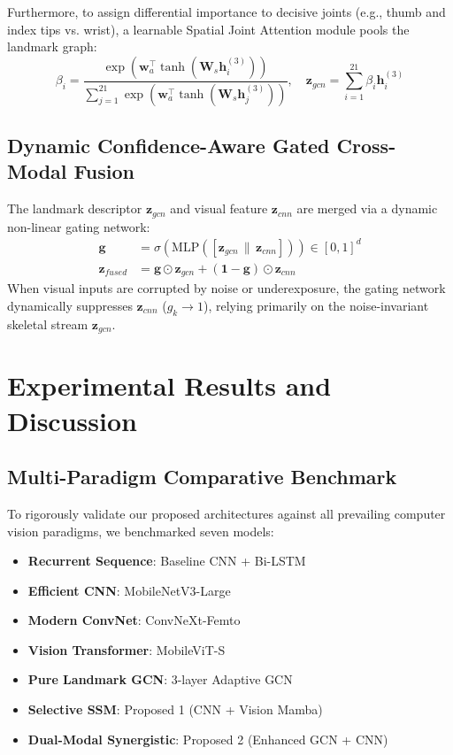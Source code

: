 \documentclass[journal]{IEEEtran}
\begin{document}
Furthermore, to assign differential importance to decisive joints (e.g., thumb and index tips vs. wrist), a learnable Spatial Joint Attention module pools the landmark graph:
\begin{equation}
    \beta_i = \frac{\exp\left(\mathbf{w}_a^\top \tanh(\mathbf{W}_s \mathbf{h}_i^{(3)})\right)}{\sum_{j=1}^{21} \exp\left(\mathbf{w}_a^\top \tanh(\mathbf{W}_s \mathbf{h}_j^{(3)})\right)}, \quad \mathbf{z}_{gcn} = \sum_{i=1}^{21} \beta_i \mathbf{h}_i^{(3)}
\end{equation}

\subsection{Dynamic Confidence-Aware Gated Cross-Modal Fusion}
The landmark descriptor $\mathbf{z}_{gcn}$ and visual feature $\mathbf{z}_{cnn}$ are merged via a dynamic non-linear gating network:
\begin{align}
    \mathbf{g} &= \sigma\left( \text{MLP}\left([\mathbf{z}_{gcn} \,\|\, \mathbf{z}_{cnn}]\right) \right) \in [0, 1]^d \\
    \mathbf{z}_{fused} &= \mathbf{g} \odot \mathbf{z}_{gcn} + (\mathbf{1} - \mathbf{g}) \odot \mathbf{z}_{cnn}
\end{align}
When visual inputs are corrupted by noise or underexposure, the gating network dynamically suppresses $\mathbf{z}_{cnn}$ ($g_k \to 1$), relying primarily on the noise-invariant skeletal stream $\mathbf{z}_{gcn}$.

\section{Experimental Results and Discussion}

\subsection{Multi-Paradigm Comparative Benchmark}
To rigorously validate our proposed architectures against all prevailing computer vision paradigms, we benchmarked seven models:
\begin{itemize}
    \item \textbf{Recurrent Sequence}: Baseline CNN + Bi-LSTM
    \item \textbf{Efficient CNN}: MobileNetV3-Large
    \item \textbf{Modern ConvNet}: ConvNeXt-Femto
    \item \textbf{Vision Transformer}: MobileViT-S
    \item \textbf{Pure Landmark GCN}: 3-layer Adaptive GCN
    \item \textbf{Selective SSM}: Proposed 1 (CNN + Vision Mamba)
    \item \textbf{Dual-Modal Synergistic}: Proposed 2 (Enhanced GCN + CNN)
\end{itemize}
\end{document}

